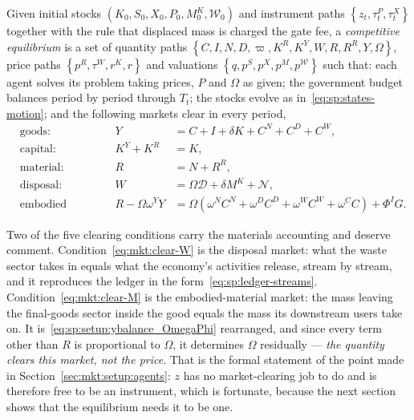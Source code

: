 \begin{definition}\label{def:mkt:eq}
Given initial stocks $\left(K_0,S_0,X_0,P_0,M^K_0,\mathcal W_0\right)$ and instrument paths $\left\{z_t,\tau^P_t,\tau^X_t\right\}$ together with the rule that displaced mass is charged the gate fee, a \emph{competitive equilibrium} is a set of quantity paths $\left\{C,I,N,D,\varpi,K^R,K^Y,W,R,R^R,Y,\Omega\right\}$, price paths $\left\{p^R,\tau^W,r^K,r\right\}$ and valuations $\left\{q,p^S,p^X,p^M,p^{\mathcal W}\right\}$ such that: each agent solves its problem taking prices, $P$ and $\Omega$ as given; the government budget balances period by period through $T_t$; the stocks evolve as in~\eqref{eq:sp:states-motion}; and the following markets clear in every period,
\begin{align}
&\text{goods:}
&
Y &= C+I+\delta K+C^N+C^D+C^W,
\label{eq:mkt:clear-goods}
\\
&\text{capital:}
&
K^Y+K^R &= K,
\label{eq:mkt:clear-K}
\\
&\text{material:}
&
R &= N+R^R,
\label{eq:mkt:clear-R}
\\
&\text{disposal:}
&
W &= \Omega\mathcal D+\delta M^K+\mathcal N,
\label{eq:mkt:clear-W}
\\
&\text{embodied material:}
&
R-\Omega\omega^YY &= \Omega\left(\omega^NC^N+\omega^DC^D+\omega^WC^W+\omega^CC\right)+\Phi^IG .
\label{eq:mkt:clear-M}
\end{align}
\end{definition}

Two of the five clearing conditions carry the materials accounting and deserve comment. Condition~\eqref{eq:mkt:clear-W} is the disposal market: what the waste sector takes in equals what the economy's activities release, stream by stream, and it reproduces the ledger in the form~\eqref{eq:sp:ledger-streams}. Condition~\eqref{eq:mkt:clear-M} is the embodied-material market: the mass leaving the final-goods sector inside the good equals the mass its downstream users take on. It is~\eqref{eq:sp:setup:ybalance_OmegaPhi} rearranged, and since every term other than $R$ is proportional to $\Omega$, it determines $\Omega$ residually --- \emph{the quantity clears this market, not the price}. That is the formal statement of the point made in Section~\ref{sec:mkt:setup:agents}: $z$ has no market-clearing job to do and is therefore free to be an instrument, which is fortunate, because the next section shows that the equilibrium needs it to be one.

